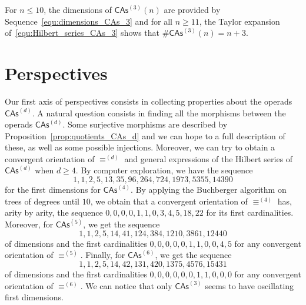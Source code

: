 \documentclass[10pt,reqno]{amsart}
\numberwithin{equation}{subsection}
\renewcommand{\leq}{\leqslant}
\renewcommand{\geq}{\geqslant}
\newcommand{\CAs}[1]{\mathsf{CAs}^{(#1)}}
\DeclareMathOperator{\Congr}{\equiv}
\newcommand{\CongrCAs}[1]{\Congr^{(#1)}}
\begin{document}
For $n \leq 10$, the dimensions of $\CAs{3}(n)$ are provided by
Sequence~\eqref{equ:dimensions_CAs_3} and for all $n \geq 11$, the
Taylor expansion of~\eqref{equ:Hilbert_series_CAs_3} shows that
$\# \CAs{3}(n) = n + 3$.
\medbreak

\section*{Perspectives}
Our first axis of perspectives consists in collecting properties about
the operads $\CAs{d}$. A natural question consists in finding all the
morphisms between the operads $\CAs{d}$. Some surjective morphisms are
described by Proposition~\ref{prop:quotients_CAs_d} and we can hope to a
full description of these, as well as some possible injections.
Moreover, we can try to obtain a convergent orientation of
$\CongrCAs{d}$ and general expressions of the Hilbert series of
$\CAs{d}$ when $d \geq 4$. By computer exploration, we have the sequence
\begin{equation}
    1, 1, 2, 5, 13, 35, 96, 264, 724, 1973, 5355, 14390
\end{equation}
for the first dimensions for $\CAs{4}$. By applying the Buchberger
algorithm on trees of degrees until $10$, we obtain that a convergent
orientation of $\CongrCAs{4}$ has, arity by arity, the sequence
\begin{math}
    0, 0, 0, 0, 1, 1, 0, 3, 4, 5, 18, 22
\end{math}
for its first cardinalities. Moreover, for $\CAs{5}$, we get the
sequence
\begin{equation}
    1, 1, 2, 5, 14, 41, 124, 384, 1210, 3861, 12440
\end{equation}
of dimensions and the first cardinalities
\begin{math}
    0, 0, 0, 0, 0, 1, 1, 0, 0, 4, 5
\end{math}
for any convergent orientation of $\CongrCAs{5}$. Finally, for
$\CAs{6}$, we get the sequence
\begin{equation}
    1, 1, 2, 5, 14, 42, 131, 420, 1375, 4576, 15431
\end{equation}
of dimensions and the first cardinalities
\begin{math}
    0, 0, 0, 0, 0, 0, 1, 1, 0, 0, 0
\end{math}
for any convergent orientation of $\CongrCAs{6}$. We can notice that
only $\CAs{3}$ seems to have oscillating first dimensions.
\medbreak
\end{document}
